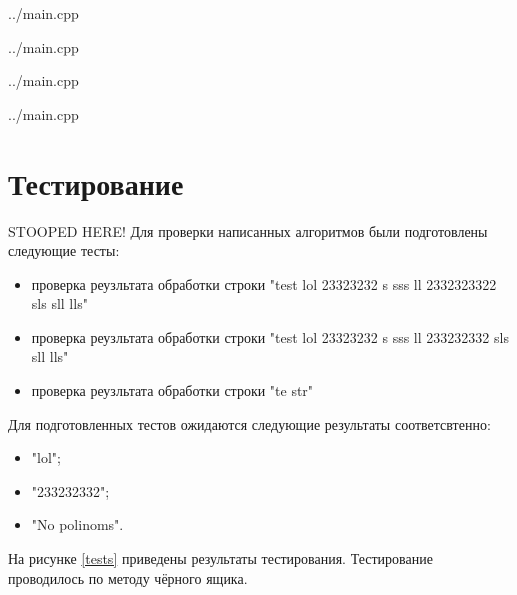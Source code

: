 \begin{lstinputlisting}[
	caption={Реализация полного перебора, часть 1},
	label={absolute_find},
	style={c},
	linerange={16-34},
	]{../main.cpp}
\end{lstinputlisting}

\newpage
\begin{lstinputlisting}[
	caption={Реализация полного перебора, часть 2},
	label={absolute_find2},
	style={c},
	linerange={36-63},
	]{../main.cpp}
\end{lstinputlisting}

\newpage
\begin{lstinputlisting}[
	caption={Реализация муравьиного алгоритма},
	label={ant1},
	style={c},
	linerange={89-133},
	]{../main.cpp}
\end{lstinputlisting}

\newpage
\begin{lstinputlisting}[
	caption={Реализация муравьиного алгоритма},
	label={ant2},
	style={c},
	linerange={134-180},
	]{../main.cpp}
\end{lstinputlisting}

\section{Тестирование}
STOOPED HERE!
Для проверки написанных алгоритмов были подготовлены следующие тесты:
\begin{itemize}
	\item проверка реузльтата обработки строки "test lol 23323232 s sss ll 2332323322 sls sll lls"
	\item проверка реузльтата обработки строки "test lol 23323232 s sss ll 233232332 sls sll lls"
	\item проверка реузльтата обработки строки "te str"
\end{itemize}

Для подготовленных тестов ожидаются следующие результаты соответсвтенно:
\begin{itemize}
	\item "lol";
	\item "233232332";
	\item "No polinoms".
\end{itemize}

На рисунке \ref{tests} приведены результаты тестирования. Тестирование проводилось по методу чёрного ящика.


